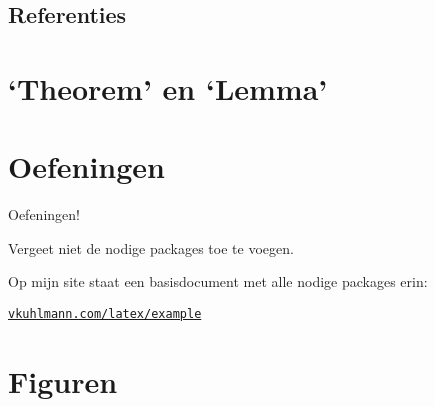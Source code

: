 \documentclass[
    dutch,
    everyoneauthor=true,
    darktheme,
    defaultSlideCollection=vincent,
    slidenames=true
]{../../cursuspresentatie}
\begin{document}


\subsection{Referenties}\label{sec:referenties}

\section{`Theorem' en `Lemma'}\label{sec:theorem}

\hypertarget{theorem}{}


\section{Oefeningen}\label{sec:oefeningen1}

\hypertarget{oefeningen1}{}

\begin{frame}
    \begin{center}
        {\LARGE Oefeningen!}
        \vspace{30pt}

        Vergeet niet de nodige packages toe te voegen.
        
        Op mijn site
        staat een basisdocument met alle nodige packages erin:

        \href{https://vkuhlmann.com/latex/example}{\nolinkurl{vkuhlmann.com/latex/example}}
    \end{center}
\end{frame}



\section{Figuren}\label{sec:figuren}

\hypertarget{figuren}{}

\end{document}
